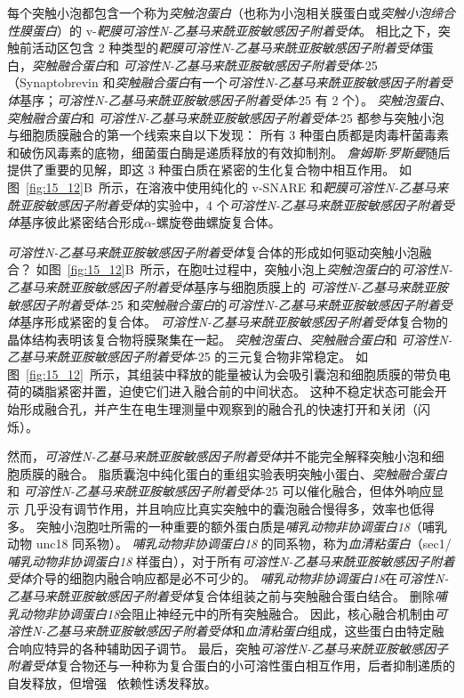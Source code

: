 每个突触小泡都包含一个称为\textit{突触泡蛋白}（也称为小泡相关膜蛋白或\textit{突触小泡缔合性膜蛋白}）的 v-\textit{靶膜可溶性N-乙基马来酰亚胺敏感因子附着受体}。
相比之下，突触前活动区包含 2 种类型的\textit{靶膜可溶性N-乙基马来酰亚胺敏感因子附着受体}蛋白，\textit{突触融合蛋白}和 \textit{可溶性N-乙基马来酰亚胺敏感因子附着受体}-25（Synaptobrevin 和\textit{突触融合蛋白}有一个\textit{可溶性N-乙基马来酰亚胺敏感因子附着受体}基序；\textit{可溶性N-乙基马来酰亚胺敏感因子附着受体}-25 有 2 个）。
\textit{突触泡蛋白}、\textit{突触融合蛋白}和 \textit{可溶性N-乙基马来酰亚胺敏感因子附着受体}-25 都参与突触小泡与细胞质膜融合的第一个线索来自以下发现：
所有 3 种蛋白质都是肉毒杆菌毒素和破伤风毒素的底物，细菌蛋白酶是递质释放的有效抑制剂。
\textit{詹姆斯$\cdot$罗斯曼}随后提供了重要的见解，即这 3 种蛋白质在紧密的生化复合物中相互作用。
如图~\ref{fig:15_12}B~所示，在溶液中使用纯化的 v-SNARE 和\textit{靶膜可溶性N-乙基马来酰亚胺敏感因子附着受体}的实验中，4 个\textit{可溶性N-乙基马来酰亚胺敏感因子附着受体}基序彼此紧密结合形成$\alpha$-螺旋卷曲螺旋复合体。


\textit{可溶性N-乙基马来酰亚胺敏感因子附着受体}复合体的形成如何驱动突触小泡融合？
如图~\ref{fig:15_12}B~所示，在胞吐过程中，突触小泡上\textit{突触泡蛋白}的\textit{可溶性N-乙基马来酰亚胺敏感因子附着受体}基序与细胞质膜上的 \textit{可溶性N-乙基马来酰亚胺敏感因子附着受体}-25 和\textit{突触融合蛋白}的\textit{可溶性N-乙基马来酰亚胺敏感因子附着受体}基序形成紧密的复合体。
\textit{可溶性N-乙基马来酰亚胺敏感因子附着受体}复合物的晶体结构表明该复合物将膜聚集在一起。
\textit{突触泡蛋白}、\textit{突触融合蛋白}和 \textit{可溶性N-乙基马来酰亚胺敏感因子附着受体}-25 的三元复合物非常稳定。
如图~\ref{fig:15_12}~所示，其组装中释放的能量被认为会吸引囊泡和细胞质膜的带负电荷的磷脂紧密并置，迫使它们进入融合前的中间状态。
这种不稳定状态可能会开始形成融合孔，并产生在电生理测量中观察到的融合孔的快速打开和关闭（闪烁）。


然而，\textit{可溶性N-乙基马来酰亚胺敏感因子附着受体}并不能完全解释突触小泡和细胞质膜的融合。
脂质囊泡中纯化蛋白的重组实验表明突触小蛋白、\textit{突触融合蛋白}和 \textit{可溶性N-乙基马来酰亚胺敏感因子附着受体}-25 可以催化融合，但体外响应显示  几乎没有调节作用，并且响应比真实突触中的囊泡融合慢得多，效率也低得多。
突触小泡胞吐所需的一种重要的额外蛋白质是\textit{哺乳动物非协调蛋白18}（哺乳动物 unc18 同系物）。
\textit{哺乳动物非协调蛋白18} 的同系物，称为\textit{血清粘蛋白}（sec1/\textit{哺乳动物非协调蛋白18} 样蛋白），对于所有\textit{可溶性N-乙基马来酰亚胺敏感因子附着受体}介导的细胞内融合响应都是必不可少的。
\textit{哺乳动物非协调蛋白18}在\textit{可溶性N-乙基马来酰亚胺敏感因子附着受体}复合体组装之前与突触融合蛋白结合。
删除\textit{哺乳动物非协调蛋白18}会阻止神经元中的所有突触融合。
因此，核心融合机制由\textit{可溶性N-乙基马来酰亚胺敏感因子附着受体}和\textit{血清粘蛋白}组成，这些蛋白由特定融合响应特异的各种辅助因子调节。
最后，突触\textit{可溶性N-乙基马来酰亚胺敏感因子附着受体}复合物还与一种称为复合蛋白的小可溶性蛋白相互作用，后者抑制递质的自发释放，但增强~ 依赖性诱发释放。


